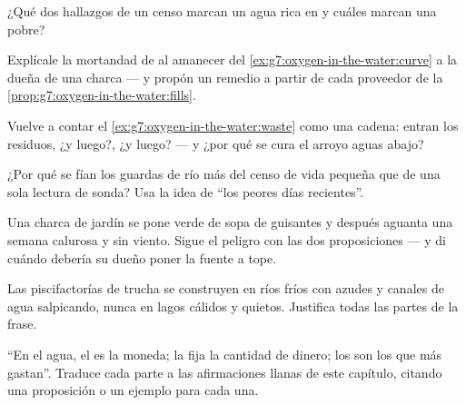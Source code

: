\begin{exercise}[$\star$]\label{exo:g7:oxygen-in-the-water:6}
¿Qué dos hallazgos de un censo marcan un agua rica en  y cuáles
marcan una pobre?
\end{exercise}

\begin{exercise}[$\star\star$]\label{exo:g7:oxygen-in-the-water:7}
Explícale la mortandad de  al amanecer del
\cref{ex:g7:oxygen-in-the-water:curve} a la dueña de una charca --- y
propón un remedio a partir de cada proveedor de la
\cref{prop:g7:oxygen-in-the-water:fills}.
\end{exercise}

\begin{exercise}[$\star\star$]\label{exo:g7:oxygen-in-the-water:8}
Vuelve a contar el \cref{ex:g7:oxygen-in-the-water:waste} como una
cadena: entran los residuos, ¿y luego?, ¿y luego? --- y ¿por qué se cura
el arroyo aguas abajo?
\end{exercise}

\begin{exercise}[$\star\star$]\label{exo:g7:oxygen-in-the-water:9}
¿Por qué se fían los guardas de río más del censo de vida pequeña que
de una sola lectura de sonda? Usa la idea de ``los peores días
recientes''.
\end{exercise}

\begin{exercise}[$\star\star$]\label{exo:g7:oxygen-in-the-water:10}
Una charca de jardín se pone verde de sopa de guisantes y después
aguanta una semana calurosa y sin viento. Sigue el peligro con las dos
proposiciones --- y di cuándo debería su dueño poner la fuente a tope.
\end{exercise}

\begin{exercise}[$\star\star$]\label{exo:g7:oxygen-in-the-water:11}
Las piscifactorías de trucha se construyen en ríos fríos con azudes y
canales de agua salpicando, nunca en lagos cálidos y quietos. Justifica
todas las partes de la frase.
\end{exercise}

\begin{exercise}[$\star\star\star$]\label{exo:g7:oxygen-in-the-water:12}
``En el agua, el  es la moneda; la  fija la cantidad
de dinero; los  son los que más gastan''. Traduce cada
parte a las afirmaciones llanas de este capítulo, citando una
proposición o un ejemplo para cada una.
\end{exercise}

